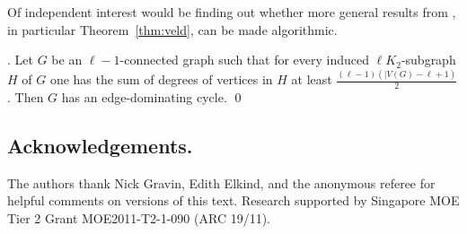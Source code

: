 \documentclass[runningheads,a4paper]{llncs}
\begin{document}
Of independent interest would be finding out whether more general results from \cite{veldman83}, 
in particular Theorem~\ref{thm:veld}, can be made algorithmic. 
\begin{theorem}\label{thm:veld}
{\rm \cite[Theorem~3]{veldman83}.} Let $G$ be an $\ell-1$-connected graph such that
for every induced $\ell K_2$-subgraph $H$ of $G$ one has the
sum of degrees of vertices in $H$ at least $\frac{(\ell-1)(|V(G)-\ell +1)}{2}$.
Then $G$ has  an edge-dominating cycle. \qed
\end{theorem}

\subsection*{Acknowledgements.}
The authors thank Nick Gravin, Edith Elkind, and the anonymous referee
for helpful comments on versions of this text.
Research supported by Singapore MOE Tier 2 Grant MOE2011-T2-1-090 (ARC 19/11). 



%
\end{document}
